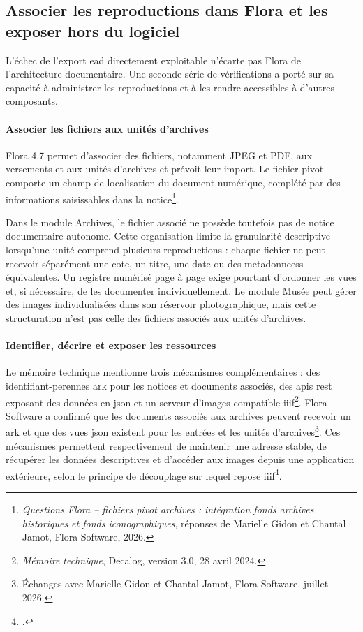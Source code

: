 \subsection{Associer les reproductions dans Flora et les exposer hors du logiciel}

L'échec de l'export \gls{ead} directement exploitable n'écarte pas Flora de l'\gls{architecture-documentaire}. Une seconde série de vérifications a porté sur sa capacité à administrer les reproductions et à les rendre accessibles à d'autres composants.

\paragraph{Associer les fichiers aux unités d'archives}

Flora 4.7 permet d'associer des fichiers, notamment JPEG et PDF, aux versements et aux unités d'archives et prévoit leur import. Le fichier pivot comporte un champ de localisation du document numérique, complété par des informations saisissables dans la notice\footnote{\emph{Questions Flora -- fichiers pivot archives : intégration fonds archives historiques et fonds iconographiques}, réponses de Marielle Gidon et Chantal Jamot, Flora Software, 2026.}.

Dans le module Archives, le fichier associé ne possède toutefois pas de notice documentaire autonome. Cette organisation limite la granularité descriptive lorsqu'une unité comprend plusieurs reproductions : chaque fichier ne peut recevoir séparément une cote, un titre, une date ou des \glspl{metadonnees} équivalentes. Un registre numérisé page à page exige pourtant d'ordonner les vues et, si nécessaire, de les documenter individuellement. Le module Musée peut gérer des images individualisées dans son réservoir photographique, mais cette structuration n'est pas celle des fichiers associés aux unités d'archives.

\paragraph{Identifier, décrire et exposer les ressources}

Le mémoire technique mentionne trois mécanismes complémentaires : des \glspl{identifiant-perenne} \gls{ark} pour les notices et documents associés, des \glspl{api} \gls{rest} exposant des données en \gls{json} et un serveur d'images compatible \gls{iiif}\footnote{\emph{Mémoire technique}, Decalog, version 3.0, 28 avril 2024.}. Flora Software a confirmé que les documents associés aux archives peuvent recevoir un \gls{ark} et que des vues \gls{json} existent pour les entrées et les unités d'archives\footnote{Échanges avec Marielle Gidon et Chantal Jamot, Flora Software, juillet 2026.}. Ces mécanismes permettent respectivement de maintenir une adresse stable, de récupérer les données descriptives et d'accéder aux images depuis une application extérieure, selon le principe de découplage sur lequel repose \gls{iiif}\footcite{SnydmanSandersonCramer2015}.

